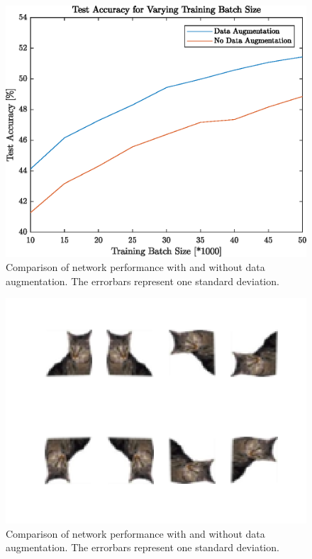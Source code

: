   	\begin{figure}[h!]
		\centering
   	  	\includegraphics{images/dataAugmentation}
   	  	\caption{Comparison of network performance with and without data augmentation. The errorbars represent one standard deviation.}
   	  	\label{fig:dataAugmentation}
   	\end{figure}
   	
   	\begin{figure}[h!]
   		\centering
   		\includegraphics{images/DataAugDemo.png}
   		\caption{Comparison of network performance with and without data augmentation. The errorbars represent one standard deviation.}
   		\label{fig:dataAugDemo}
   	\end{figure}   	
   	
